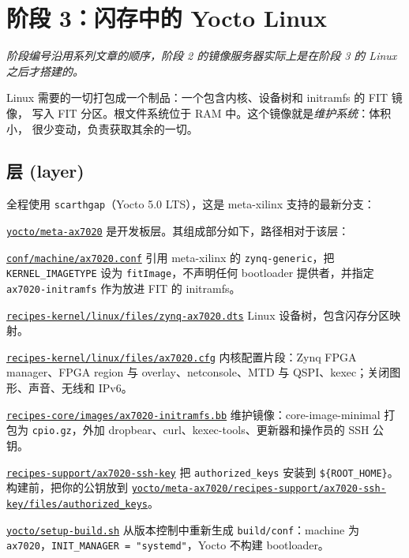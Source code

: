 \documentclass[11pt,a4paper,oneside]{article}
\newcommand{\file}[1]{{\color{bluemid}\nolinkurl{#1}}}
\newcommand{\cmd}[1]{\texttt{#1}}
\newcommand{\repo}{https://github.com/MaxClerkwell/ax7020-bringup}
\newcommand{\rfile}[1]{\href{\repo/blob/master/#1}{\color{bluemid}\nolinkurl{#1}}}
\newcommand{\lfile}[1]{\href{\repo/blob/master/yocto/meta-ax7020/#1}{\color{bluemid}\nolinkurl{#1}}}
\begin{document}
\section{阶段 3：闪存中的 Yocto Linux}

\emph{阶段编号沿用系列文章的顺序，阶段 2 的镜像服务器实际上是在阶段 3 的 Linux
之后才搭建的。}

Linux 需要的一切打包成一个制品：一个包含内核、设备树和 initramfs 的 FIT 镜像，
写入 FIT 分区。根文件系统位于 RAM 中。这个镜像就是\emph{维护系统}：体积小，
很少变动，负责获取其余的一切。

\subsection{层 (layer)}

全程使用 \cmd{scarthgap}（Yocto 5.0 LTS），这是 meta-xilinx 支持的最新分支：


\rfile{yocto/meta-ax7020} 是开发板层。其组成部分如下，路径相对于该层：

\begin{filelist}
  \item[\lfile{conf/machine/ax7020.conf}] 引用 meta-xilinx 的 \cmd{zynq-generic}，把 \cmd{KERNEL\_IMAGETYPE} 设为 \cmd{fitImage}，不声明任何 bootloader 提供者，并指定 \cmd{ax7020-initramfs} 作为放进 FIT 的 initramfs。
  \item[\lfile{recipes-kernel/linux/files/zynq-ax7020.dts}] Linux 设备树，包含闪存分区映射。
  \item[\lfile{recipes-kernel/linux/files/ax7020.cfg}] 内核配置片段：Zynq FPGA manager、FPGA region 与 overlay、netconsole、MTD 与 QSPI、kexec；关闭图形、声音、无线和 IPv6。
  \item[\lfile{recipes-core/images/ax7020-initramfs.bb}] 维护镜像：core-image-minimal 打包为 \cmd{cpio.gz}，外加 dropbear、curl、kexec-tools、更新器和操作员的 SSH 公钥。
  \item[\lfile{recipes-support/ax7020-ssh-key}] 把 \file{authorized_keys} 安装到 \cmd{\$\{ROOT\_HOME\}}。构建前，把你的公钥放到 \rfile{yocto/meta-ax7020/recipes-support/ax7020-ssh-key/files/authorized_keys}。
  \item[\rfile{yocto/setup-build.sh}] 从版本控制中重新生成 \file{build/conf}：machine 为 \cmd{ax7020}，\cmd{INIT\_MANAGER = "systemd"}，Yocto 不构建 bootloader。
\end{filelist}
\end{document}
